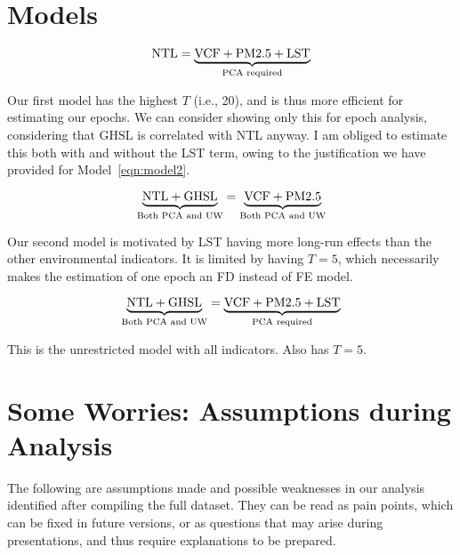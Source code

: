 \documentclass[a4paper,12pt]{article} %
\begin{document}
\section{Models}

\begin{equation}
    \rm{NTL} = \underbrace{\rm{VCF} + \rm{PM2.5} + \rm{LST}}_{\text{PCA required}}
\label{eqn:model1}
\end{equation}

Our first model has the highest $T$ (i.e., 20), and is thus more efficient for estimating our epochs. We can consider showing only this for epoch analysis, considering that $\text{GHSL}$ is correlated with NTL anyway. I am obliged to estimate this both with and without the LST term, owing to the justification we have provided for Model~\ref{eqn:model2}.


\begin{equation}
    \underbrace{\rm{NTL} + \rm{GHSL}}_{\text{Both PCA and UW}} = \underbrace{\rm{VCF} + \rm{PM2.5}}_{\text{Both PCA and UW}}
\label{eqn:model2}
\end{equation}

Our second model is motivated by LST having more long-run effects than the other environmental indicators. It is limited by having $T = 5$, which necessarily makes the estimation of one epoch an FD instead of FE model.


\begin{equation}
    \underbrace{\rm{NTL} + \rm{GHSL}}_{\text{Both PCA and UW}} = \underbrace{\rm{VCF} + \rm{PM2.5} + \rm{LST}}_{\text{PCA required}}
\label{eqn:model3}
\end{equation}

This is the unrestricted model with all indicators. Also has $T = 5$.


\section{Some Worries: Assumptions during Analysis}

The following are assumptions made and possible weaknesses in our analysis identified after compiling the full dataset. They can be read as pain points, which can be fixed in future versions, or as questions that may arise during presentations, and thus require explanations to be prepared.
\end{document}
